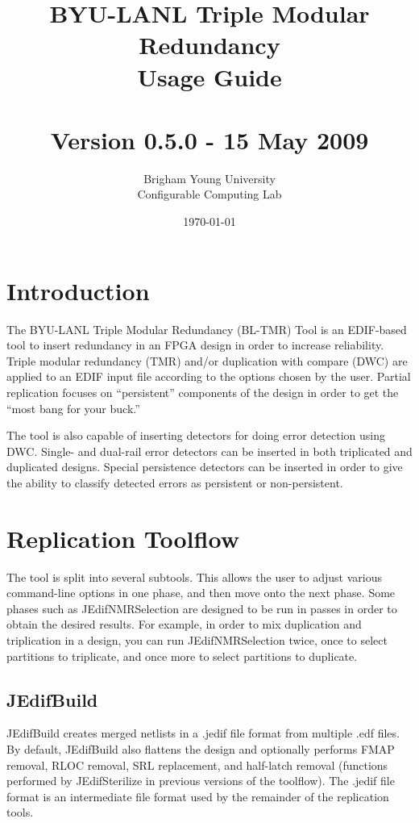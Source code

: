 \documentclass[english]{article}
\title{BYU-LANL Triple Modular Redundancy \\ Usage Guide \\ ~ \\
  Version 0.5.0 - 15 May 2009 \\  }
\author{Brigham Young University \\ Configurable Computing Lab}
\date{\today}
\numberwithin{figure}{section}
\begin{document}
\maketitle

\newpage
\tableofcontents
\newpage

\section{Introduction}
The BYU-LANL Triple Modular Redundancy (BL-TMR) Tool is an EDIF-based
tool to insert redundancy in an FPGA design in order to increase
reliability. Triple modular redundancy (TMR) and/or duplication with
compare (DWC) are applied to an EDIF input file according to the
options chosen by the user. Partial replication focuses on ``persistent''
components of the design in order to get the ``most bang for your buck.''

The tool is also capable of inserting detectors for doing error detection using
DWC. Single- and dual-rail error detectors can be inserted in both triplicated
and duplicated designs. Special persistence detectors can be inserted in order
to give the ability to classify detected errors as persistent or non-persistent.

\section{Replication Toolflow}
The tool is split into several subtools. This allows the user to
adjust various command-line options in one phase, and then move onto
the next phase. Some phases such as JEdifNMRSelection are designed to be run in
passes in order to obtain the desired results. For example, in order to mix
duplication and triplication in a design, you can run JEdifNMRSelection twice,
once to select partitions to triplicate, and once more to select partitions to
duplicate.

\subsection{JEdifBuild}
JEdifBuild creates merged netlists in a .jedif file format from
multiple .edf files. By default, JEdifBuild also flattens the design
and optionally performs FMAP removal, RLOC removal, SRL replacement,
and half-latch removal (functions performed by JEdifSterilize in
previous versions of the toolflow). The .jedif file format is an
intermediate file format used by the remainder of the replication
tools.
\end{document}
